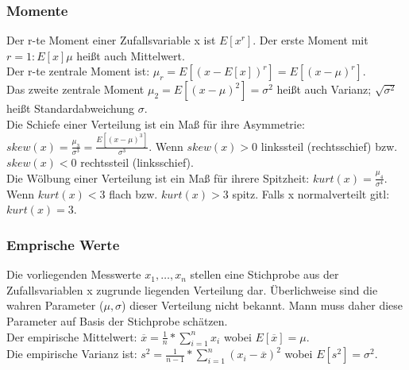 \documentclass{article} %
\begin{document}
		\subsubsection{Momente}
		Der r-te Moment einer Zufallsvariable x ist $E[x^r]$. Der erste Moment mit $r=1: E[x] \mu$ heißt auch Mittelwert.\\
		Der r-te zentrale Moment ist: $\mu_r = E[(x-E[x])^r] = E[(x-\mu)^r]$.\\ 
		Das zweite zentrale Moment $\mu_2 = E[(x-\mu)^2] = \sigma^2$ heißt auch Varianz; $\sqrt{\sigma^2}$ heißt Standardabweichung $\sigma$.\\
		Die Schiefe einer Verteilung ist ein Maß für ihre Asymmetrie: $skew(x) = \frac{\mu_3}{\sigma^3} = \frac{E[(x-\mu)^3]}{\sigma^3}$. Wenn $skew(x) > 0$ linkssteil (rechtsschief) bzw. $skew(x) < 0$ rechtssteil (linksschief).\\
		Die Wölbung einer Verteilung ist ein Maß für ihrere Spitzheit: $kurt(x) = \frac{\mu_4}{\sigma^4}$. Wenn $kurt(x) < 3$ flach bzw. $kurt(x) > 3$ spitz. Falls x normalverteilt gitl: $kurt(x)=3$.
		\subsubsection{Emprische Werte}
		Die vorliegenden Messwerte $x_1,\dots,x_n$ stellen eine Stichprobe aus der Zufallsvariablen x zugrunde liegenden Verteilung dar. Überlichweise sind die wahren Parameter ($\mu,\sigma$) dieser Verteilung nicht bekannt. Mann muss daher diese Parameter auf Basis der Stichprobe schätzen.\\
		Der empirische Mittelwert: $\overline{x} = \frac{1}{n}*\sum_{i=1}^{n} x_i$ wobei $E[\overline{x}] = \mu$.\\
		Die empirische Varianz ist: $s^2 = \frac{1}{n-1}*\sum_{i=1}^{n}(x_i-\overline{x})^2$ wobei $E[s^2] = \sigma^2$.
\end{document}

